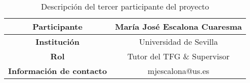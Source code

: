 \begin{table}[H]
    \centering
    \begin{tabular}{|c|c|}
    \hline
    \textbf{Participante} & María José Escalona Cuaresma \\
    \hline
    \textbf{Institución} & Universidad de Sevilla \\
    \hline
    \textbf{Rol} & Tutor del TFG \& Supervisor \\
    \hline
    \textbf{Información de contacto} & mjescalona@us.es \\
    \hline
    \end{tabular}
\caption{Descripción del tercer participante del proyecto}
\label{tab:tercerParticipante}
\end{table}
